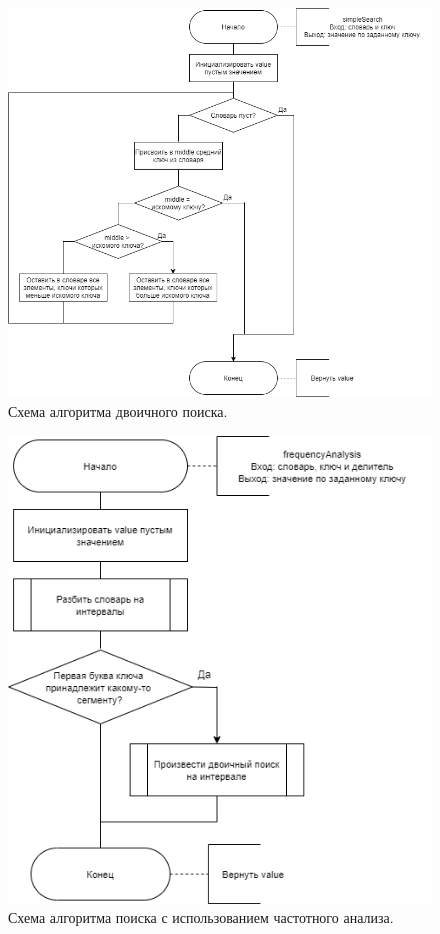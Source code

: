 \documentclass[12pt]{report}
\begin{document}
\begin{figure}[H]
	\centering
	\includegraphics[scale=0.7]{binary_search.drawio.png}
	\caption{Схема алгоритма двоичного поиска.}
	\label{fig:mpr}
\end{figure}

\begin{figure}[H]
	\centering
	\includegraphics[scale=0.8]{freq_analysis.drawio.png}
	\caption{Схема алгоритма поиска с использованием частотного анализа.}
	\label{fig:mpr}
\end{figure}
\end{document}
